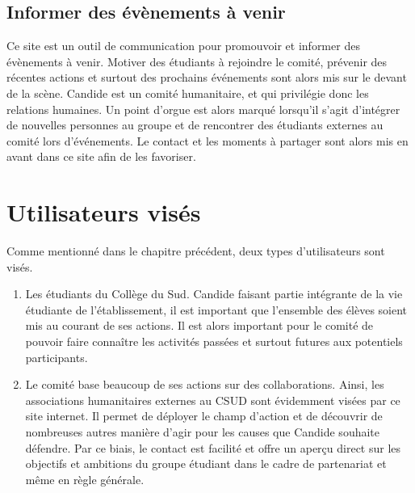 \documentclass[a4,10pt,french]{sphinxmanual}
\begin{document}
\subsection{Informer des évènements à venir}
\label{\detokenize{introduction:informer-des-evenements-a-venir}}
\sphinxAtStartPar
Ce site est un outil de communication pour promouvoir et informer des évènements à venir. Motiver des étudiants à rejoindre le comité, prévenir des récentes actions et surtout des prochains événements sont alors mis sur le devant de la scène. Candide est un comité humanitaire, et qui privilégie donc les relations humaines. Un point d’orgue est alors marqué lorsqu’il s’agit d’intégrer de nouvelles personnes au groupe et de rencontrer des étudiants externes au comité lors d’événements. Le contact et les moments à partager sont alors mis en avant dans ce site afin de les favoriser.


\section{Utilisateurs visés}
\label{\detokenize{introduction:utilisateurs-vises}}
\sphinxAtStartPar
Comme mentionné dans le chapitre précédent, deux types d’utilisateurs sont visés.
\begin{enumerate}
%
\item {} 
\sphinxAtStartPar
Les étudiants du Collège du Sud. Candide faisant partie intégrante de la vie étudiante de l’établissement, il est important que l’ensemble des élèves soient mis au courant de ses actions. Il est alors important pour le comité de pouvoir faire connaître les activités passées et surtout futures aux potentiels participants.

\item {} 
\sphinxAtStartPar
Le comité base beaucoup de ses actions sur des collaborations. Ainsi, les associations humanitaires externes au CSUD sont évidemment visées par ce site internet. Il permet de déployer le champ d’action et de découvrir de nombreuses autres manière d’agir pour les causes que Candide souhaite défendre. Par ce biais, le contact est facilité et offre un aperçu direct sur les objectifs et ambitions du groupe étudiant dans le cadre de partenariat et même en règle générale.

\end{enumerate}
\end{document}
